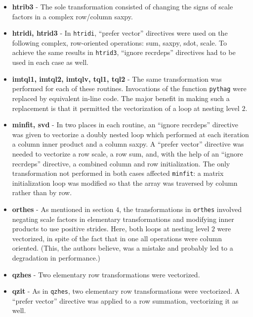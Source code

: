 \begin{itemize}
\item {\bf htrib3} -
	The sole transformation consisted of changing the signs of
     scale factors in a complex row/column saxpy.

\item {\bf htridi, htrid3 } -
	In {\tt htridi}, ``prefer vector'' directives were used on the following
     complex, row-oriented operations: sum, saxpy, sdot, scale.  To achieve
     the same results in {\tt htrid3}, ``ignore recrdeps'' directives had
	to be used in each case as well.

\item {\bf imtql1, imtql2, imtqlv, tql1, tql2} -
	The same transformation was
     performed for each of these routines.  Invocations of the function
     {\tt pythag} were replaced by equivalent in-line code.  The major
     benefit in making such a replacement is that it permitted the
     vectorization of a loop at nesting level $2$.

\item {\bf minfit, svd} -
	In two places in each routine, an ``ignore recrdeps'' directive
     was given to vectorize a doubly nested loop which performed at
     each iteration a column inner product and a column saxpy.
	A ``prefer vector''
     directive was needed to vectorize a row scale, a row sum, and,
     with the help of an ``ignore recrdeps'' directive, a combined
	column and row
     initialization.  The only transformation not performed in both
     cases affected {\tt minfit}: a matrix initialization loop was
     modified so that the array was traversed by column rather than
     by row.

\item {\bf orthes} -
	As mentioned in section $4$, the transformations in {\tt orthes}
     involved negating scale factors in elementary transformations and
     modifying inner products to use positive strides.
     Here, both loops at nesting level $2$ were vectorized, in spite of the
     fact that in one all operations were column oriented.  (This, the
     authors believe, was a mistake and probably led to a degradation in
     performance.)

\item {\bf qzhes } - Two elementary row transformations were vectorized.
\item {\bf qzit  } - As in {\tt qzhes}, two elementary row transformations
     were vectorized.  A ``prefer vector'' directive was applied
	to a row summation, vectorizing it as well.


\end{itemize}
